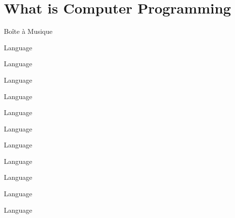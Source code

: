 \section{What is Computer Programming}

\begin{frame}{Bo\^{i}te \`{a} Musique}
  
\end{frame}


\begin{frame}{Language}
  
\end{frame}

\begin{frame}{Language}
  
\end{frame}

\begin{frame}{Language}
  
\end{frame}

\begin{frame}{Language}
  
\end{frame}

\begin{frame}{Language}
  
\end{frame}

\begin{frame}{Language}
  
\end{frame}

\begin{frame}{Language}
  
\end{frame}

\begin{frame}{Language}
  
\end{frame}

\begin{frame}{Language}
  
\end{frame}

\begin{frame}{Language}
  
\end{frame}

\begin{frame}{Language}
  
\end{frame}


